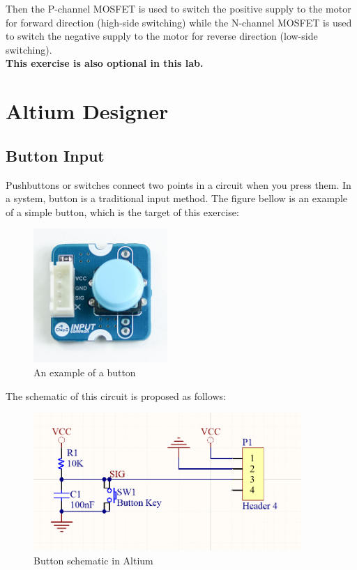 Then the P-channel MOSFET is used to switch the positive supply to the motor for forward direction (high-side switching) while the N-channel MOSFET is used to switch the negative supply to the motor for reverse direction (low-side switching).\\

\textbf{This exercise is also optional in this lab.}
\section{Altium Designer}
\subsection{Button Input}
Pushbuttons or switches connect two points in a circuit when you press them. In a system, button is a traditional input method. The figure bellow is an example of a simple button, which is the target of this exercise:
\begin{figure}[!htp]
    \centering
    \includegraphics[width = 2in]{source/picture/bai_6/ChipI_Button.jpg}
    \caption{An example of a button}
    \label{altium_1a}
\end{figure}

The schematic of this circuit is proposed as follows:
\begin{figure}[!htp]
    \centering
    \includegraphics[width = 4in]{source/picture/bai_6/altium_1.PNG}
    \caption{Button schematic in Altium}
    \label{altium_1b}
\end{figure}

